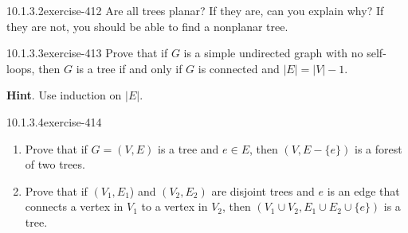\documentclass[twoside,10pt,]{book}
\numberwithin{equation}{section}
\begin{document}
\begin{divisionsolution}{10.1.3.2}{}{exercise-412}%
\hypertarget{p-3549}{}%
Are all trees planar? If they are, can you explain why? If they are not, you should be able to find a nonplanar tree.%
\end{divisionsolution}%
\begin{divisionsolution}{10.1.3.3}{}{exercise-413}%
\hypertarget{p-3550}{}%
Prove that if \(G\) is a simple undirected graph with no self-loops, then \(G\) is a tree if and only if \(G\) is connected and \(\lvert E \rvert = \lvert V \rvert - 1\).%
\par\smallskip%
\noindent\textbf{Hint}.\quad%
\hypertarget{p-3551}{}%
Use induction on \(\lvert E\rvert \).%
\end{divisionsolution}%
\begin{divisionsolution}{10.1.3.4}{}{exercise-414}%
\hypertarget{p-3552}{}%
\leavevmode%
\begin{enumerate}[label=(\alph*)]
\item\hypertarget{li-1644}{}\hypertarget{p-3553}{}%
Prove that if \(G = (V, E)\) is a tree and \(e \in E\), then \((V, E - \{e\})\) is a forest of two trees.%
\item\hypertarget{li-1645}{}\hypertarget{p-3554}{}%
Prove that if \(\left(V_1,E_1\right.\)) and \(\left(V_2,E_2\right)\) are disjoint trees and \(e\) is an edge that connects a vertex in \(V_1\) to a vertex in \(V_2\), then \(\left(V_1\cup V_2, E_1\cup E_2\cup \{e\}\right)\) is a tree.%
\end{enumerate}
%
\end{divisionsolution}%
\end{document}
